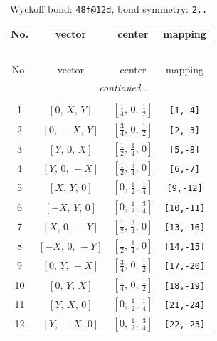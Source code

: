 \documentclass[fleqn,8pt]{jsarticle}
\begin{document}
\begin{longtable}{cccc}
\caption{Wyckoff bond: {\tt 48f@12d}, bond symmetry: {\tt 2..}}
 \\
 \hline \hline
No. & vector & center & mapping \\ \hline \endfirsthead

\multicolumn{3}{l}{\tablename\ \thetable{}} \\
 \hline \hline
No. & vector & center & mapping \\ \hline \endhead

 \hline \hline
\multicolumn{3}{r}{\footnotesize\it continued ...} \\ \endfoot

 \hline \hline
\multicolumn{3}{r}{} \\ \endlastfoot

1 & $\left[ 0,\, X,\, Y \right]$ & $\left[ \frac{1}{4},\, 0,\, \frac{1}{2} \right]$ & {\tt [1,-4]} \\ \hline
2 & $\left[ 0,\, - X,\, Y \right]$ & $\left[ \frac{3}{4},\, 0,\, \frac{1}{2} \right]$ & {\tt [2,-3]} \\ \hline
3 & $\left[ Y,\, 0,\, X \right]$ & $\left[ \frac{1}{2},\, \frac{1}{4},\, 0 \right]$ & {\tt [5,-8]} \\ \hline
4 & $\left[ Y,\, 0,\, - X \right]$ & $\left[ \frac{1}{2},\, \frac{3}{4},\, 0 \right]$ & {\tt [6,-7]} \\ \hline
5 & $\left[ X,\, Y,\, 0 \right]$ & $\left[ 0,\, \frac{1}{2},\, \frac{1}{4} \right]$ & {\tt [9,-12]} \\ \hline
6 & $\left[ - X,\, Y,\, 0 \right]$ & $\left[ 0,\, \frac{1}{2},\, \frac{3}{4} \right]$ & {\tt [10,-11]} \\ \hline
7 & $\left[ X,\, 0,\, - Y \right]$ & $\left[ \frac{1}{2},\, \frac{3}{4},\, 0 \right]$ & {\tt [13,-16]} \\ \hline
8 & $\left[ - X,\, 0,\, - Y \right]$ & $\left[ \frac{1}{2},\, \frac{1}{4},\, 0 \right]$ & {\tt [14,-15]} \\ \hline
9 & $\left[ 0,\, Y,\, - X \right]$ & $\left[ \frac{3}{4},\, 0,\, \frac{1}{2} \right]$ & {\tt [17,-20]} \\ \hline
10 & $\left[ 0,\, Y,\, X \right]$ & $\left[ \frac{1}{4},\, 0,\, \frac{1}{2} \right]$ & {\tt [18,-19]} \\ \hline
11 & $\left[ Y,\, X,\, 0 \right]$ & $\left[ 0,\, \frac{1}{2},\, \frac{1}{4} \right]$ & {\tt [21,-24]} \\ \hline
12 & $\left[ Y,\, - X,\, 0 \right]$ & $\left[ 0,\, \frac{1}{2},\, \frac{3}{4} \right]$ & {\tt [22,-23]} \\ \hline

\end{longtable}
\end{document}
